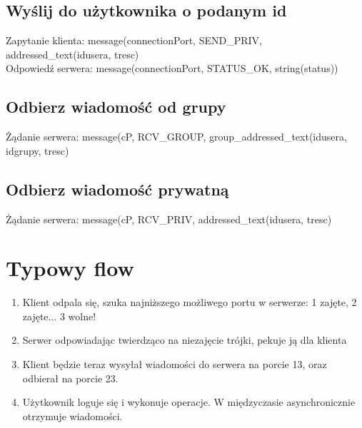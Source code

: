 \documentclass[a4paper]{article}
\begin{document}
\subsection{Wyślij do użytkownika o podanym id}
Zapytanie klienta: message(connectionPort, SEND\_PRIV, addressed\_text(idusera, tresc)\\
Odpowiedź serwera: message(connectionPort, STATUS\_OK, string(status))
\subsection{Odbierz wiadomość od grupy}
Żądanie serwera: message(cP, RCV\_GROUP, group\_addressed\_text(idusera, idgrupy, tresc)\\
\subsection{Odbierz wiadomość prywatną}
Żądanie serwera: message(cP, RCV\_PRIV, addressed\_text(idusera, tresc)\\


\section{Typowy flow}
\begin{enumerate}
\item Klient odpala się, szuka najniższego możliwego portu w serwerze: 1 zajęte, 2 zajęte... 3 wolne!
\item Serwer odpowiadając twierdząco na niezajęcie trójki, pekuje ją dla klienta
\item Klient będzie teraz wysyłał wiadomości do serwera na porcie 13, oraz odbierał na porcie 23.
\item Użytkownik loguje się i wykonuje operacje. W międzyczasie asynchronicznie otrzymuje wiadomości.
\end{enumerate}
\end{document}
